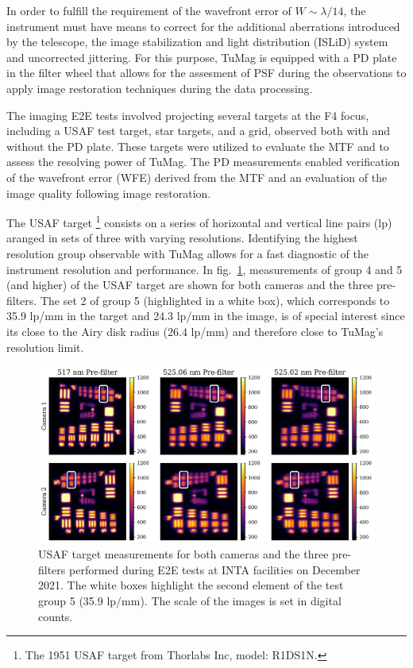 In order to fulfill the requirement of the wavefront error of $W \sim \lambda / 14$, the instrument must have means to correct for the additional aberrations introduced by the telescope, the image stabilization and light distribution (ISLiD) system and uncorrected jittering. For this purpose, TuMag is equipped with a PD plate in the filter wheel that allows for the assesment of PSF during the observations to apply image restoration techniques during the data processing.  

The imaging E2E tests involved projecting several targets at the F4 focus, including a USAF test target, star targets, and a grid, observed both with and without the PD plate. These targets were utilized to evaluate the MTF and to assess the resolving power of TuMag. The PD measurements enabled verification of the wavefront error (WFE) derived from the MTF and an evaluation of the image quality following image restoration. 

The USAF target \footnote{The 1951 USAF target from Thorlabs Inc, model: R1DS1N.} consists on a series of horizontal and vertical line pairs (lp) aranged in sets of three with varying resolutions. Identifying the highest resolution group observable with TuMag allows for a fast diagnostic of the instrument resolution and performance. In fig.~\ref{tumag : USAF}, measurements of group 4 and 5 (and higher) of the USAF target are shown for both cameras and the three pre-filters. The set 2 of group 5 (highlighted in a white box), which corresponds to 35.9 lp/mm in the target and 24.3 lp/mm in the image, is of special interest since its close to the Airy disk radius (26.4 lp/mm) and therefore close to TuMag's resolution limit. 

\begin{figure}
    \includegraphics[width=\textwidth]{figures/TuMag/USAF_E2E.pdf}
    \caption{
      USAF target measurements for both cameras and the three pre-filters performed during E2E tests at INTA facilities on December 2021. The white boxes highlight the second element of the test group 5 (35.9 lp/mm). The scale of the images is set in digital counts.}
      \label{tumag : USAF}
\end{figure}

